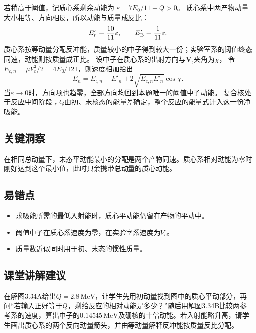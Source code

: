 \documentclass[UTF8,fontset=fandol,a4paper,11pt]{ctexart}
\newcommand{\vect}[1]{\bm{#1}}
\begin{document}
若稍高于阈值，记质心系剩余动能为
$\varepsilon=7E_0/11-Q>0$。
质心系中两产物动量大小相等、方向相反，所以动能与质量成反比：
\[
E'_n=\frac{10}{11}\varepsilon,\qquad
E'_{\rm B}=\frac1{11}\varepsilon.
\]
质心系按等动量分配反冲能，质量较小的中子得到较大一份；实验室系的阈值终态同速，动能则按质量成正比。
设中子在质心系的出射方向与$\vect V_c$夹角为$\chi$，
令$E_{c,n}=\mu V_c^2/2=4E_0/121$，则速度相加给出
\[
E_n=E_{c,n}+E'_n+2\sqrt{E_{c,n}E'_n}\cos\chi.
\]
当$\varepsilon\to0$时，方向项也趋零，全部方向均回到本题唯一的阈值中子动能。
复合核处于反应中间阶段；$Q$由初、末核态的能量差确定，整个反应的能量式计入这一份净吸能。




\subsection*{关键洞察}

在相同总动量下，末态平动能最小的分配是两个产物同速。质心系相对动能为零时刚好达到这个最小值，此时只余携带总动量的质心动能。



\subsection*{易错点}

\begin{itemize}
\item 求吸能所需的最低入射能时，质心平动能仍留在产物的平动中。
\item 阈值中子在质心系速度为零，在实验室系速度为$V_c$。
\item 质量数近似同时用于初、末态的惯性质量。
\end{itemize}



\subsection*{课堂讲解建议}

在解图3.34A给出$Q=2.8\,\mathrm{MeV}$，让学生先用初动量找到图中的质心平动部分，再问“若输入正好等于$Q$，剩给反应的相对动能是多少？”随后用解图3.34B比较两参考系的速度，算出中子的$0.14545\,\mathrm{MeV}$及硼核的十倍动能。若入射能略升高，请学生画出质心系的两个反向动量箭头，并由等动量解释反冲能按质量反比分配。
\end{document}

